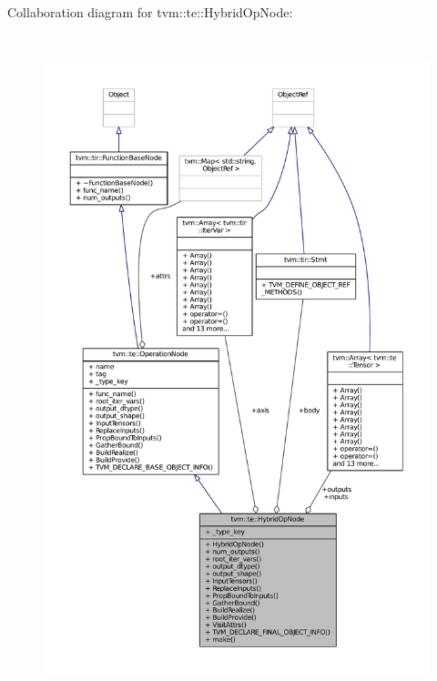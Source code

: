 Collaboration diagram for tvm\+:\+:te\+:\+:Hybrid\+Op\+Node\+:
\nopagebreak
\begin{figure}[H]
\begin{center}
\leavevmode
\includegraphics[height=550pt]{classtvm_1_1te_1_1HybridOpNode__coll__graph}
\end{center}
\end{figure}

